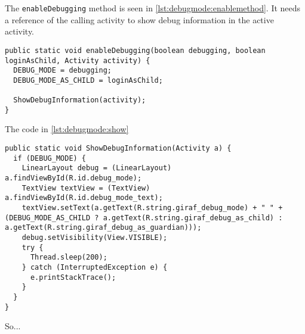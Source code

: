 The \lstinline|enableDebugging| method is seen in \cref{lst:debugmode:enablemethod}.
It needs a reference of the calling activity to show debug information in the active activity.

\begin{lstlisting}[caption={Enable debug mode by calling \lstinline|enableDebugging|.},label={lst:debugmode:enablemethod}]  
public static void enableDebugging(boolean debugging, boolean loginAsChild, Activity activity) {
  DEBUG_MODE = debugging;
  DEBUG_MODE_AS_CHILD = loginAsChild;

  ShowDebugInformation(activity);
}
\end{lstlisting}

The code in \cref{lst:debugmode:show}


\begin{lstlisting}[caption={Show a debug information on activity if debug is enabled.},label={lst:debugmode:show}]  
public static void ShowDebugInformation(Activity a) {
  if (DEBUG_MODE) {
    LinearLayout debug = (LinearLayout) a.findViewById(R.id.debug_mode);
    TextView textView = (TextView) a.findViewById(R.id.debug_mode_text);
    textView.setText(a.getText(R.string.giraf_debug_mode) + " " + (DEBUG_MODE_AS_CHILD ? a.getText(R.string.giraf_debug_as_child) : a.getText(R.string.giraf_debug_as_guardian)));
    debug.setVisibility(View.VISIBLE);
    try {
      Thread.sleep(200);
    } catch (InterruptedException e) {
      e.printStackTrace();
    }
  }
}
\end{lstlisting}
So...